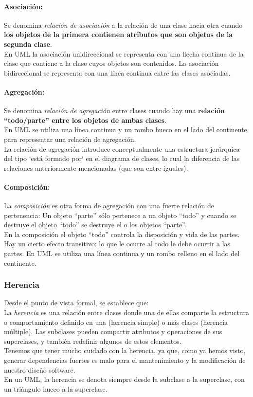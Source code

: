 \paragraph{Asociación:}
Se denomina \emph{relación de asociación} a la relación de una clase
hacia otra cuando \textbf{los objetos de la primera contienen
  atributos que son objetos de la segunda clase}. \\
En UML la asociación unidireccional se representa con una flecha
continua de la clase que contiene a la clase cuyos objetos son
contenidos. La asociación bidireccional se representa con una línea
continua entre las clases asociadas.
\paragraph{Agregación:}
Se denomina \emph{relación de agregación} entre clases cuando hay una
\textbf{relación “todo/parte” entre los objetos de ambas clases}. \\
En UML se utiliza una línea continua y un rombo hueco en el lado del
continente para representar una relación de agregación. \\
La relación de agregación introduce conceptualmente una estructura
jerárquica del tipo `está formado por` en el diagrama de clases, lo
cual la diferencia de las relaciones anteriormente mencionadas (que
son entre iguales).
\paragraph{Composición:}
La \emph{composición} es otra forma de agregación con una fuerte
relación de pertenencia: Un objeto “parte” sólo pertenece a un objeto
“todo” y cuando se destruye el objeto “todo” se destruye el o los
objetos “parte”. \\
En la composición el objeto “todo” controla la disposición y vida de
las partes. Hay un cierto efecto transitivo: lo que le ocurre al todo
le debe ocurrir a las partes. En UML se utiliza una línea continua y
un rombo relleno en el lado del continente.
\subsubsection{Herencia}
Desde el punto de vista formal, se establece que: \\
La \emph{herencia} es una relación entre clases donde una de ellas
comparte la estructura o comportamiento definido en una (herencia
simple) o más clases (herencia múltiple). Las subclases pueden compartir
atributos y operaciones de sus superclases, y también redefinir
algunos de estos elementos. \\
Tenemos que tener mucho cuidado con la herencia, ya que, como ya hemos
visto, generar dependencias fuertes es malo para el mantenimiento y la
modificación de nuestro diseño software. \\
En un UML, la herencia se denota siempre desde la subclase a la
superclase, con un triángulo hueco a la superclase.
